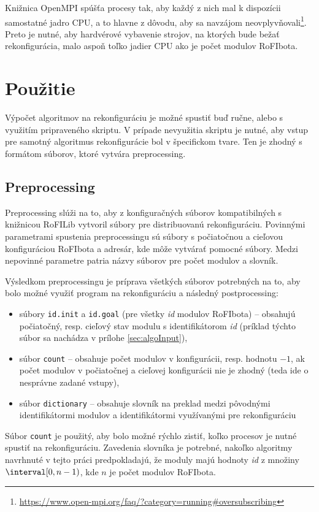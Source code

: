 \documentclass[
  printed, %
  oneside, %
  notable,   %
  nolof,     %
  nolot,     %
]{fithesis3}
\begin{document}
Knižnica OpenMPI spúšťa procesy tak, aby každý z nich mal k dispozícii samostatné jadro CPU, a to hlavne z dôvodu, aby sa navzájom neovplyvňovali\footnote{\url{https://www.open-mpi.org/faq/?category=running\#oversubscribing}}. Preto je nutné, aby hardvérové vybavenie strojov, na ktorých bude bežať rekonfigurácia, malo aspoň toľko jadier CPU ako je počet modulov RoFIbota. 

\section{Použitie}
Výpočet algoritmov na rekonfiguráciu je možné spustiť buď ručne, alebo s využitím pripraveného skriptu. V prípade nevyužitia skriptu je nutné, aby vstup pre samotný algoritmus rekonfigurácie bol v špecifickom tvare. Ten je zhodný s formátom súborov, ktoré vytvára preprocessing.

\subsection{Preprocessing}
Preprocessing slúži na to, aby z konfiguračných súborov kompatibilných s knižnicou RoFILib vytvoril súbory pre distribuovanú rekonfiguráciu. Povinnými parametrami spustenia preprocessingu sú súbory s počiatočnou a cieľovou konfiguráciou RoFIbota a adresár, kde môže vytvárať pomocné súbory. Medzi nepovinné parametre patria názvy súborov pre počet modulov a slovník. 

Výsledkom preprocessingu je príprava všetkých súborov potrebných na to, aby bolo možné využiť program na rekonfiguráciu a následný postprocessing: 
\begin{itemize}
    \item súbory \texttt{id.init} a \texttt{id.goal} (pre všetky \textit{id} modulov RoFIbota) -- obsahujú počiatočný, resp. cieľový stav modulu s identifikátorom \textit{id} (príklad týchto súbor sa nachádza v prílohe \ref{sec:algoInput}), 
    \item súbor \texttt{count} -- obsahuje počet modulov v konfigurácii, resp. hodnotu $-1$, ak počet modulov v počiatočnej a cieľovej konfigurácii nie je zhodný (teda ide o nesprávne zadané vstupy), 
    \item súbor \texttt{dictionary} -- obsahuje slovník na preklad medzi pôvodnými identifikátormi modulov a identifikátormi využívanými pre rekonfiguráciu
\end{itemize}

Súbor \texttt{count} je použitý, aby bolo možné rýchlo zistiť, koľko procesov je nutné spustiť na rekonfiguráciu. Zavedenia slovníka je potrebné, nakoľko algoritmy navrhnuté v tejto práci predpokladajú, že moduly majú hodnoty \textit{id} z množiny $\interval[0, n - 1)$, kde $n$ je počet modulov RoFIbota.
\end{document}
